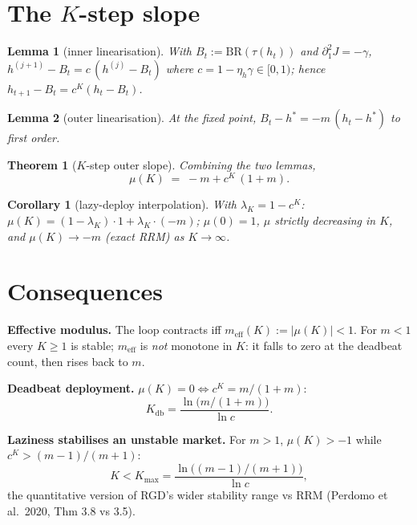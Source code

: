 \documentclass[11pt]{article}
\newtheorem{theorem}{Theorem}
\newtheorem{lemma}{Lemma}
\newtheorem{corollary}{Corollary}
\newcommand{\BR}{\mathrm{BR}}
\newcommand{\meff}{m_{\mathrm{eff}}}
\begin{document}
\section{The $K$-step slope}

\begin{lemma}[inner linearisation]
With $B_t := \BR(\tau(h_t))$ and $\partial_1^2 J = -\gamma$,
$h^{(j+1)} - B_t = c\,(h^{(j)} - B_t)$ where $c = 1-\eta_h\gamma \in [0,1)$;
hence $h_{t+1} - B_t = c^K (h_t - B_t)$.
\end{lemma}

\begin{lemma}[outer linearisation]
At the fixed point, $B_t - h^* = -m\,(h_t - h^*)$ to first order.
\end{lemma}

\begin{theorem}[$K$-step outer slope]
\label{thm:mu}
Combining the two lemmas,
\begin{equation}
  \mu(K) \;=\; -m + c^K\,(1+m).
  \tag{6.1}
\end{equation}
\end{theorem}

\begin{corollary}[lazy-deploy interpolation]
With $\lambda_K = 1-c^K$: $\mu(K) = (1-\lambda_K)\cdot 1 +
\lambda_K\cdot(-m)$; $\mu(0)=1$, $\mu$ strictly decreasing in $K$, and
$\mu(K)\to -m$ (exact RRM) as $K\to\infty$.
\end{corollary}

\section{Consequences}

\textbf{Effective modulus.} The loop contracts iff $\meff(K) := |\mu(K)| < 1$.
For $m<1$ every $K\ge 1$ is stable; $\meff$ is \emph{not} monotone in $K$: it
falls to zero at the deadbeat count, then rises back to $m$.

\textbf{Deadbeat deployment.} $\mu(K)=0 \iff c^K = m/(1+m)$:
\begin{equation}
  K_{\mathrm{db}} = \frac{\ln\!\big(m/(1+m)\big)}{\ln c}.
  \tag{6.2}
\end{equation}

\textbf{Laziness stabilises an unstable market.} For $m>1$, $\mu(K) > -1$
while $c^K > (m-1)/(m+1)$:
\begin{equation}
  K < K_{\max} = \frac{\ln\!\big((m-1)/(m+1)\big)}{\ln c},
  \tag{6.3}
\end{equation}
the quantitative version of RGD's wider stability range vs RRM (Perdomo et
al.\ 2020, Thm 3.8 vs 3.5).
\end{document}
